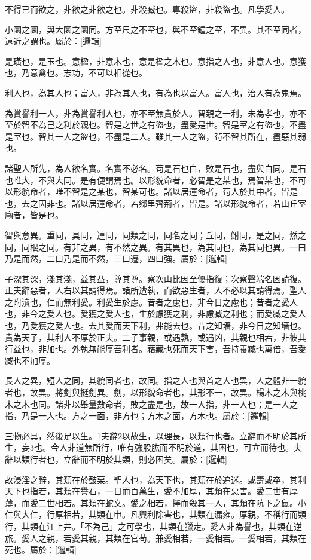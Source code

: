 \begin{pinyinscope}
不得已而欲之，非欲之非欲之也。非殺臧也。專殺盜，非殺盜也。凡學愛人。

小圜之圜，與大圜之圜同。方至尺之不至也，與不至鐘之至，不異。其不至同者，遠近之謂也。屬於：[邏輯]

是璜也，是玉也。意楹，非意木也，意是楹之木也。意指之人也，非意人也。意獲也，乃意禽也。志功，不可以相從也。

利人也，為其人也；富人，非為其人也，有為也以富人。富人也，治人有為鬼焉。

為賞譽利一人，非為賞譽利人也，亦不至無貴於人。智親之一利，未為孝也，亦不至於智不為己之利於親也。智是之世之有盜也，盡愛是世。智是室之有盜也，不盡是室也。智其一人之盜也，不盡是二人。雖其一人之盜，茍不智其所在，盡惡其弱也。

諸聖人所先，為人欲名實。名實不必名。苟是石也白，敗是石也，盡與白同。是石也唯大，不與大同。是有便謂焉也。以形貌命者，必智是之某也，焉智某也，不可以形貌命者，唯不智是之某也，智某可也。諸以居運命者，苟人於其中者，皆是也，去之因非也。諸以居運命者，若鄉里齊荊者，皆是。諸以形貌命者，若山丘室廟者，皆是也。

智與意異。重同，具同，連同，同類之同，同名之同；丘同，鮒同，是之同，然之同，同根之同。有非之異，有不然之異。有其異也，為其同也，為其同也異。一曰乃是而然，二曰乃是而不然，三曰遷，四曰強。屬於：[邏輯]

子深其深，淺其淺，益其益，尊其尊。察次山比因至優指復；次察聲端名因請復。正夫辭惡者，人右以其請得焉。諸所遭執，而欲惡生者，人不必以其請得焉。聖人之附瀆也，仁而無利愛。利愛生於慮。昔者之慮也，非今日之慮也；昔者之愛人也，非今之愛人也。愛獲之愛人也，生於慮獲之利，非慮臧之利也；而愛臧之愛人也，乃愛獲之愛人也。去其愛而天下利，弗能去也。昔之知墻，非今日之知墻也。貴為天子，其利人不厚於正夫。二子事親，或遇孰，或遇凶，其親也相若，非彼其行益也，非加也。外執無能厚吾利者。藉藏也死而天下害，吾持養臧也萬倍，吾愛臧也不加厚。

長人之異，短人之同，其貌同者也，故同。指之人也與首之人也異，人之體非一貌者也，故異。將劍與挺劍異。劍，以形貌命者也，其形不一，故異。楊木之木與桃木之木也同。諸非以舉量數命者，敗之盡是也，故一人指，非一人也；是一人之指，乃是一人也。方之一面，非方也；方木之面，方木也。屬於：[邏輯]

三物必具，然後足以生。1夫辭2以故生，以理長，以類行也者。立辭而不明於其所生，妄3也。今人非道無所行，唯有強股肱而不明於道，其困也，可立而待也。夫辭以類行者也，立辭而不明於其類，則必困矣。屬於：[邏輯]

故浸淫之辭，其類在於鼓栗。聖人也，為天下也，其類在於追迷。或壽或卒，其利天下也指若，其類在譽石，一日而百萬生，愛不加厚，其類在惡害。愛二世有厚薄，而愛二世相若。其類在蛇文。愛之相若，擇而殺其一人，其類在阬下之鼠。小仁與大仁，行厚相若，其類在申。凡興利除害也，其類在漏雍。厚親，不稱行而類行，其類在江上井。「不為己」之可學也，其類在獵走。愛人非為譽也，其類在逆旅。愛人之親，若愛其親，其類在官茍。兼愛相若，一愛相若。一愛相若，其類在死也。屬於：[邏輯]


\end{pinyinscope}